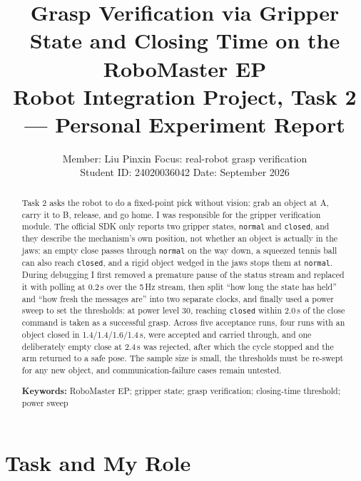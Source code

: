 \documentclass[11pt,a4paper]{ctexart}
\title{\heiti\Large Grasp Verification via Gripper State and Closing Time on the RoboMaster EP\\
       \normalsize Robot Integration Project, Task 2 --- Personal Experiment Report}
\author{\normalsize Member: Liu Pinxin \quad Focus: real-robot grasp verification\\
        \normalsize Student ID: 24020036042 \quad Date: September 2026}
\date{}
\begin{document}
\maketitle
\thispagestyle{empty}

\begin{abstract}
Task 2 asks the robot to do a fixed-point pick without vision: grab an object
at A, carry it to B, release, and go home. I was responsible for the gripper
verification module. The official SDK only reports two gripper states,
\texttt{normal} and \texttt{closed}, and they describe the mechanism's own
position, not whether an object is actually in the jaws: an empty close
passes through \texttt{normal} on the way down, a squeezed tennis ball can
also reach \texttt{closed}, and a rigid object wedged in the jaws stops them
at \texttt{normal}. During debugging I first removed a premature pause of the
status stream and replaced it with polling at 0.2\,s over the 5\,Hz stream,
then split ``how long the state has held'' and ``how fresh the messages are''
into two separate clocks, and finally used a power sweep to set the
thresholds: at power level 30, reaching \texttt{closed} within 2.0\,s of the
close command is taken as a successful grasp. Across five acceptance runs,
four runs with an object closed in 1.4/1.4/1.6/1.4\,s, were accepted and
carried through, and one deliberately empty close at 2.4\,s was rejected,
after which the cycle stopped and the arm returned to a safe pose. The sample
size is small, the thresholds must be re-swept for any new object, and
communication-failure cases remain untested.

\vspace{1em}
\noindent\textbf{Keywords:} RoboMaster EP; gripper state; grasp verification;
closing-time threshold; power sweep
\end{abstract}

\section{Task and My Role}
\end{document}
